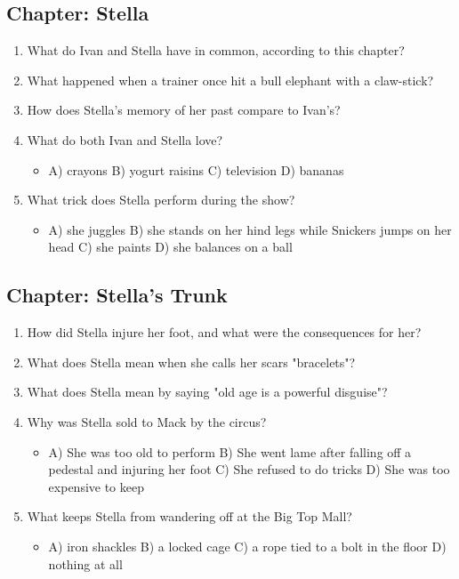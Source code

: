 \documentclass[11pt]{article}
\begin{document}
\subsection*{Chapter: Stella}
\begin{enumerate}
  \item What do Ivan and Stella have in common, according to this chapter?
  \vspace{0.5in}
  \item What happened when a trainer once hit a bull elephant with a claw-stick?
  \vspace{0.5in}
  \item How does Stella's memory of her past compare to Ivan's?
  \vspace{0.5in}
  \item What do both Ivan and Stella love?
  \begin{itemize}\setlength\itemsep{0pt}
    \item[] A) crayons \quad B) yogurt raisins \quad C) television \quad D) bananas
  \end{itemize}
  \item What trick does Stella perform during the show?
  \begin{itemize}\setlength\itemsep{0pt}
    \item[] A) she juggles \quad B) she stands on her hind legs while Snickers jumps on her head \quad C) she paints \quad D) she balances on a ball
  \end{itemize}
\end{enumerate}

\subsection*{Chapter: Stella's Trunk}
\begin{enumerate}
  \item How did Stella injure her foot, and what were the consequences for her?
  \vspace{0.5in}
  \item What does Stella mean when she calls her scars "bracelets"?
  \vspace{0.5in}
  \item What does Stella mean by saying "old age is a powerful disguise"?
  \vspace{0.5in}
  \item Why was Stella sold to Mack by the circus?
  \begin{itemize}\setlength\itemsep{0pt}
    \item[] A) She was too old to perform \quad B) She went lame after falling off a pedestal and injuring her foot \quad C) She refused to do tricks \quad D) She was too expensive to keep
  \end{itemize}
  \item What keeps Stella from wandering off at the Big Top Mall?
  \begin{itemize}\setlength\itemsep{0pt}
    \item[] A) iron shackles \quad B) a locked cage \quad C) a rope tied to a bolt in the floor \quad D) nothing at all
  \end{itemize}
\end{enumerate}
\end{document}
